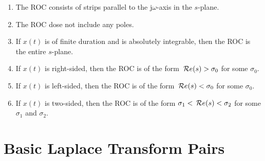 \documentclass[10pt,UTF8]{article}
\newenvironment{definition box}
{\begin{tcolorbox}[colback=blue!5!white,colframe=blue!75!black,parbox=false,before upper=\par,before lower=\par]}
{\end{tcolorbox}}
\newenvironment{theorem box}
{\begin{tcolorbox}[colback=yellow!5!white,colframe=yellow!75!black,parbox=false,before upper=\par,before lower=\par]}
{\end{tcolorbox}}
\theoremstyle{definition}
\newtheorem{definition inner}{Definition}[section]
\theoremstyle{plain}
\newtheorem{theorem inner}{Theorem}[section]
\theoremstyle{definition}
\newtheorem*{proof inner}{\textit{Proof}}
\theoremstyle{remark}
\newcommand{\ju}{\mathrm{j}}  %
\renewcommand{\Re}{\,\mathcal{R}\ensuremath{e}\qty}
\begin{document}
\begin{enumerate}
    \item The ROC consists of strips parallel to the $\ju\omega$-axis in the $s$-plane.
    \item The ROC dose not include any poles.
    \item If $x(t)$ is of finite duration and is absolutely integrable,
    then the ROC is the entire $s$-plane.
    \item If $x(t)$ is right-sided, then the ROC is of the form $\Re(s) > \sigma_0$
    for some $\sigma_0$.
    \item If $x(t)$ is left-sided, then the ROC is of the form $\Re(s) < \sigma_0$
    for some $\sigma_0$.
    \item If $x(t)$ is two-sided, then the ROC is of
    the form $\sigma_1 < \Re(s) < \sigma_2$ for some $\sigma_1$ and $\sigma_2$.
\end{enumerate}



\section{Basic Laplace Transform Pairs}
\end{document}
